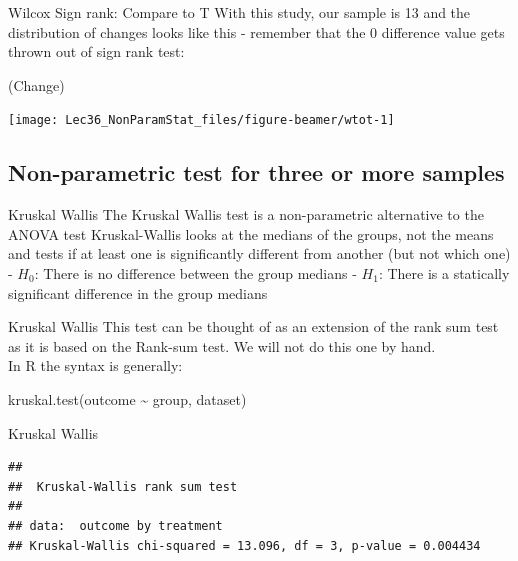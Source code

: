\documentclass[
  ignorenonframetext,
  aspectratio=169]{beamer}
\newenvironment{Shaded}{\begin{snugshade}}{\end{snugshade}}
\newcommand{\FunctionTok}[1]{\textcolor[rgb]{0.13,0.29,0.53}{\textbf{#1}}}
\newcommand{\NormalTok}[1]{#1}
\renewcommand{\textbf}{\structure}
\begin{document}
\begin{frame}[fragile]{Wilcox Sign rank: Compare to T}
\protect\hypertarget{wilcox-sign-rank-compare-to-t-1}{}
With this study, our sample is 13 and the distribution of changes looks
like this - remember that the 0 difference value gets thrown out of sign
rank test:

\begin{Shaded}
\begin{Highlighting}[]
\FunctionTok{hist}\NormalTok{(Change)}
\end{Highlighting}
\end{Shaded}

\begin{center}\texttt{[image: Lec36\_NonParamStat\_files/figure-beamer/wtot-1]} \end{center}
\end{frame}

\hypertarget{non-parametric-test-for-three-or-more-samples}{%
\subsection{Non-parametric test for three or more
samples}\label{non-parametric-test-for-three-or-more-samples}}

\begin{frame}{Kruskal Wallis}
\protect\hypertarget{kruskal-wallis}{}
The Kruskal Wallis test is a non-parametric alternative to the ANOVA
test Kruskal-Wallis looks at the medians of the groups, not the means
and tests if at least one is significantly different from another (but
not which one) - \(H_{0}\): There is no difference between the group
medians - \(H_{1}\): There is a statically significant difference in the
group medians
\end{frame}

\begin{frame}{Kruskal Wallis}
\protect\hypertarget{kruskal-wallis-1}{}
This test can be thought of as an extension of the rank sum test as it
is based on the Rank-sum test. We will not do this one by hand.\\
In R the syntax is generally:

kruskal.test(outcome \textasciitilde{} group, dataset)
\end{frame}

\begin{frame}[fragile]{Kruskal Wallis}
\protect\hypertarget{kruskal-wallis-2}{}
\begin{verbatim}
## 
##  Kruskal-Wallis rank sum test
## 
## data:  outcome by treatment
## Kruskal-Wallis chi-squared = 13.096, df = 3, p-value = 0.004434
\end{verbatim}
\end{frame}
\end{document}
